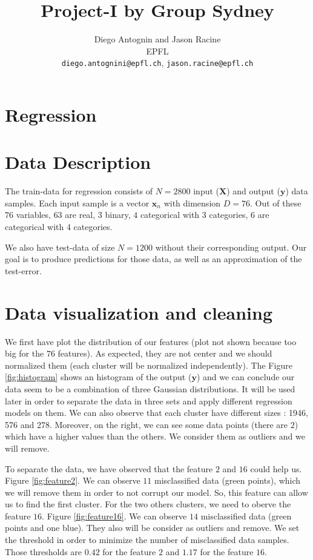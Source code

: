 \documentclass{article} %
\title{Project-I by Group Sydney}
\author{
Diego Antognin and Jason Racine \\
EPFL \\
\texttt{diego.antognini@epfl.ch}, \texttt{jason.racine@epfl.ch} \\
}
\begin{document}
\maketitle

\begin{abstract}

\end{abstract}

\section{Regression}

\section{Data Description}

The train-data for regression consists of $N = 2800$ input ($\mathbf{X}$) and output ($\mathbf{y}$) data samples. Each input sample is a vector $\mathbf{x}_n$ with dimension $D = 76$. Out of these $76$ variables, $63$ are real, $3$ binary, $4$ categorical with 3 categories, $6$ are categorical with 4 categories.

We also have test-data of size $N=1200$ without their corresponding output. Our goal is to produce predictions for those data, as well as an approximation of the test-error.

\section{Data visualization and cleaning}

We first have plot the distribution of our features (plot not shown because too big for the $76$ features). As expected, they are not center and we should normalized them (each cluster will be normalized independently). The Figure \ref{fig:histogram} shows an histogram of the output ($\mathbf{y}$) and we can conclude our data  seem to be a combination of three Gaussian distributions. It will be used later in order to separate the data in three sets and apply different regression models on them. We can also observe that each cluster have different sizes : 1946, 576 and 278. Moreover, on the right, we can see some data points (there are $2$) which have a higher values than the others. We consider them as outliers and we will remove.

To separate the data, we have observed that the feature $2$ and $16$ could help us. Figure \ref{fig:feature2}. We can observe $11$ misclassified data (green points), which we will remove them in order to not corrupt our model.  So, this feature can allow us to find the first cluster. For the two others clusters, we need to oberve the feature $16$. Figure \ref{fig:feature16}. We can observe $14$ misclassified data (green points and one blue). They also will be consider as outliers and remove. We set the threshold in order to minimize the number of misclassified data samples. Those thresholds are $0.42$ for the feature $2$ and $1.17$ for the feature $16$.
\end{document}
